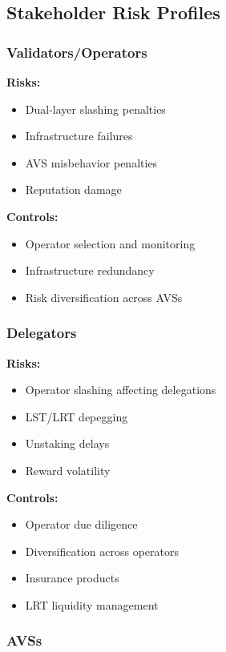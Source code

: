 \documentclass[runningheads]{llncs}
\begin{document}
\subsection{Stakeholder Risk Profiles}

\subsubsection{Validators/Operators}

\textbf{Risks:}
\begin{itemize}
    \item Dual-layer slashing penalties
    \item Infrastructure failures
    \item AVS misbehavior penalties
    \item Reputation damage
\end{itemize}

\textbf{Controls:}
\begin{itemize}
    \item Operator selection and monitoring
    \item Infrastructure redundancy
    \item Risk diversification across AVSs
\end{itemize}

\subsubsection{Delegators}

\textbf{Risks:}
\begin{itemize}
    \item Operator slashing affecting delegations
    \item LST/LRT depegging
    \item Unstaking delays
    \item Reward volatility
\end{itemize}

\textbf{Controls:}
\begin{itemize}
    \item Operator due diligence
    \item Diversification across operators
    \item Insurance products
    \item LRT liquidity management
\end{itemize}

\subsubsection{AVSs}
\end{document}
